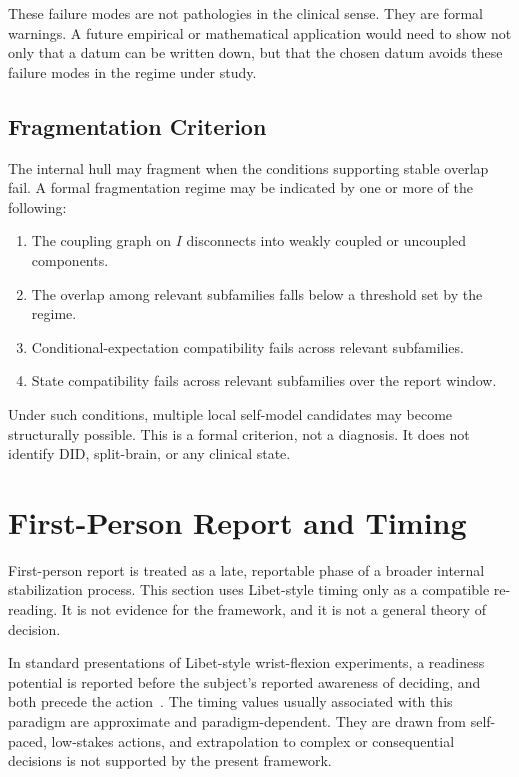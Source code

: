 \documentclass[12pt]{article}
\theoremstyle{definition}
\theoremstyle{remark}
\begin{document}
These failure modes are not pathologies in the clinical sense. They are
formal warnings. A future empirical or mathematical application would
need to show not only that a datum can be written down, but that the
chosen datum avoids these failure modes in the regime under study.

\subsection{Fragmentation Criterion}

The internal hull may fragment when the conditions supporting stable
overlap fail. A formal fragmentation regime may be indicated by one or
more of the following:
\begin{enumerate}[label=(F\arabic*)]
\item The coupling graph on \(I\) disconnects into weakly coupled or
uncoupled components.
\item The overlap among relevant subfamilies falls below a threshold
set by the regime.
\item Conditional-expectation compatibility fails across relevant
subfamilies.
\item State compatibility fails across relevant subfamilies over the
report window.
\end{enumerate}

Under such conditions, multiple local self-model candidates may become
structurally possible. This is a formal criterion, not a diagnosis. It
does not identify DID, split-brain, or any clinical state.

\section{First-Person Report and Timing}

First-person report is treated as a late, reportable phase of a broader
internal stabilization process. This section uses Libet-style timing
only as a compatible re-reading. It is not evidence for the framework,
and it is not a general theory of decision.

In standard presentations of Libet-style wrist-flexion experiments, a
readiness potential is reported before the subject's reported awareness
of deciding, and both precede the action~\cite{Libet1983,Haggard2008,Schurger2012}. The timing values usually associated
with this paradigm are approximate and paradigm-dependent. They are
drawn from self-paced, low-stakes actions, and extrapolation to complex
or consequential decisions is not supported by the present framework.
\end{document}
